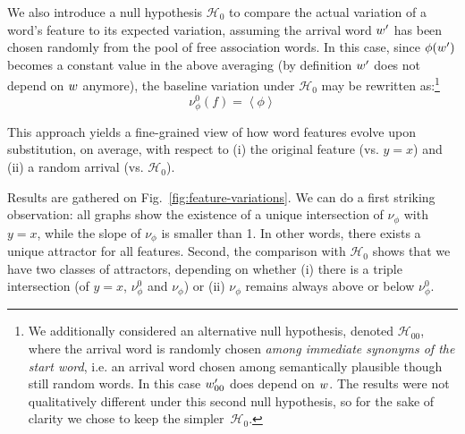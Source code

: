 We also introduce a null hypothesis $\mathcal{H}_0$ to compare the actual variation of a word's feature to its expected variation, assuming the arrival word $w'$ has been chosen randomly from the pool of free association words.
In this case, since $\phi(w')$ becomes a constant value in the above averaging (by definition $w'$ does not depend on $w$ anymore),  the baseline variation under $\mathcal{H}_0$ may be rewritten as:\footnote{We additionally considered an alternative null hypothesis, denoted $\mathcal{H}_{00}$, where the arrival word is randomly chosen \emph{among immediate synonyms of the start word}, \hbox{i.e.} an arrival word chosen among semantically plausible though still random words. In this case $w'_{00}$ does depend on $w$. The results were not qualitatively different under this second null hypothesis, so for the sake of clarity we chose to keep the simpler~$\mathcal{H}_0$.}
$$\nu_{\phi}^0 (f) = \left<\phi\right>$$

This approach yields a fine-grained view of how word features evolve upon substitution, on average, with respect to (i) the original feature (\hbox{vs.} $y=x$) and (ii) a random arrival (\hbox{vs.} $\mathcal{H}_0$).

\medskip Results are gathered on Fig.~\ref{fig:feature-variations}.
 We can do a first striking observation: all graphs show the existence of a unique intersection of $\nu_{\phi}$ with $y=x$, while the slope of $\nu_{\phi}$ is smaller than 1.  In other words, there exists a unique attractor for all features.  
Second, the comparison with $\mathcal{H}_0$ shows that we have two classes of attractors, depending on whether (i) there is a triple intersection (of $y=x$, $\nu_{\phi}^0$ and $\nu_{\phi}$) or (ii) $\nu_{\phi}$ remains always above or below $\nu_{\phi}^0$.

 \todo{}



